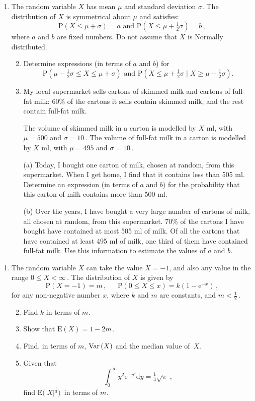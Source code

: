 \documentclass[a4, 11pt]{report}
\newlength{\qspace}
\newcounter{qnumber}
\newenvironment{question}%
 {\vspace{\qspace}
  \begin{enumerate}[\bfseries 1\quad][10]%
    \setcounter{enumi}{\value{qnumber}}%
    \item%
 }
{
  \end{enumerate}
  \filbreak
  \stepcounter{qnumber}
 }
\newenvironment{questionparts}[1][1]%
 {
  \begin{enumerate}[\bfseries (i)]%
    \setcounter{enumii}{#1}
    \addtocounter{enumii}{-1}
    \setlength{\itemsep}{5mm}
    \setlength{\parskip}{8pt}
 }
 {
  \end{enumerate}
 }
\def\d{{\mathrm d}}
\def\e{{\mathrm e}}
\def\E{{\mathrm E}}
\def\P{{\mathrm P}}
\def\le{\leqslant}
\def\ge{\geqslant}
\def\var{{\rm Var}\,}
\def\l{\left(}
\def\r{\right)}
\begin{document}
\begin{question}
The random variable $X$ has mean $\mu$ and standard deviation $\sigma$.
The distribution of $X$
is symmetrical about $\mu$ and satisfies:
\[
\P \l X \le \mu + \sigma \r = a 
\mbox{ \ \ \ \ \ and  \ \ \ \ \ } 
\P \l X \le \mu + \tfrac{1}{ 2}\sigma \r = b\,,\]
 where $a$ and $b$ are fixed numbers. Do not assume that $X$ is Normally distributed.

\begin{questionparts}
\item 
Determine expressions (in terms of $a$ and $b$) 
for 
\[
\P \l \mu-\tfrac12 \sigma \le X \le \mu + \sigma \r
\mbox{ \ \ \ \ \ and \ \ \ \ \ \ } 
\P \l X \le \mu +\tfrac12 \sigma \; \big\vert \; X \ge \mu - \tfrac12 \sigma \r.\]

\item  My local supermarket sells cartons of skimmed 
milk and cartons of full-fat milk: 60\% of the cartons 
it sells  contain skimmed milk, and the rest contain full-fat milk. 


The volume of skimmed milk in a carton  is  modelled by 
$X$ ml, with $\mu = 500$ and $\sigma =10\,$.
The volume of full-fat milk in a  carton is  modelled by  $X$ ml,
 with $\mu = 495$ and $\sigma = 10\,$.

(a) 
Today, I bought one carton of milk, chosen at random, from this supermarket. 
When I get home, I find that it contains less than 505 ml. 
Determine an expression (in terms of $a$ and $b$) 
for the probability that this carton of milk contains more than 500 ml.


(b) Over the years, I have bought a very large number of cartons of milk, 
all chosen at random, 
from this supermarket. 70\% of the cartons 
I have bought have contained at most 505 ml of milk. 
Of all the cartons that have contained at least 495 ml of milk, 
one third of them have contained full-fat milk. 
Use this information to estimate the values of $a$ and $b$. 

\end{questionparts}
\end{question}

\begin{question}
The random variable $X$ can take the value \mbox{$X=-1$}, and also any
value in the range \mbox{$0\le X <\infty\,$}. The distribution of $X$ is given by
\[
\P(X=-1) =m  \,, \ \ \ \ \ \ \ \P(0\le X\le x) = k(1-\e^{-x})\,,
\]
for any non-negative number $x$, where $k$ and $m$ are  constants, and 
$m <\frac12\,$.

\begin{questionparts}
\item Find $k$ in terms of $m$. 
\item Show that $\E(X)= 1-2m\,$. 
\item Find, in terms of $m$, $\var (X)$ and 
  the median value of~$X$.
\item Given that 
\[
\int_0^\infty y^2 \e^{-y^2} \d y = \tfrac14 \sqrt{ \pi}\;,\]
find  $\E\big(\vert X \vert^{\frac12}\big)\,$ in terms of $m$.
\end{questionparts}
\end{question}
	
\end{document}

